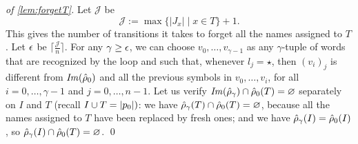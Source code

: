 \begin{proof}[of \cref{lem:forgetT}]
Let $\mathcal{J}$ be
\[
	\mathcal{J} := \max \{ |J_x|\mid x \in T \} + 1 .
\]
This gives the number of transitions it takes to forget all the names assigned to $T$. Let $\epsilon$ be $\lceil \frac{\mathcal{J}}{n} \rceil$. For any $\gamma \geq \epsilon$, we can choose $v_0,\dots,v_{\gamma-1}$ as any $\gamma$-tuple of words that are recognized by the loop and such that, whenever $l_j = \star$, then $(v_i)_j$ is different from $\mathit{Im}(\hat{\rho}_0)$ and all the previous symbols in $v_0,\dots,v_i$, for all $i=0,\dots,\gamma-1$ and $j=0,\dots,n-1$. Let us verify $\mathit{Im}(\hat{\rho}_\gamma) \cap \hat{\rho}_0(T) = \varnothing$ separately on $I$ and $T$ (recall $I \cup T = |p_0|)$: we have $\hat{\rho}_\gamma(T) \cap \hat{\rho}_0(T) = \varnothing$, because all the names assigned to $T$ have been replaced by fresh ones; and we have $\hat{\rho}_\gamma(I) = \hat{\rho}_0(I)$, so $\hat{\rho}_\gamma(I) \cap \hat{\rho}_0(T) = \varnothing$.
\qed
\end{proof}


